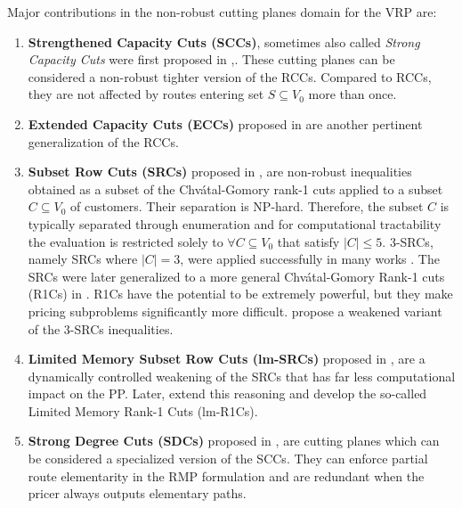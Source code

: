 Major contributions in the non-robust cutting planes domain for the VRP are:
\begin{enumerate}
	\setlength{\itemsep}{0pt}
	\setlength{\parskip}{0pt}

	\item \textbf{Strengthened Capacity Cuts (SCCs)}, sometimes also called \textit{Strong Capacity Cuts}
	      were first proposed in \textcite{baldacci2008},.
	      These cutting planes can be considered a non-robust tighter version of the RCCs.
	      Compared to RCCs, they are not affected by routes entering set $S \subseteq V_0$ more than once.
	\item \textbf{Extended Capacity Cuts (ECCs)} proposed in \textcite{pessoa2008, pessoa2009}
	      are another pertinent generalization of the RCCs.
	\item \textbf{Subset Row Cuts (SRCs)} proposed in \textcite{jepsen2008subsetrow},
	      are non-robust inequalities obtained as a subset of the
	      Chv\'atal-Gomory rank-1 cuts \parencite{chvatal1973}
	      applied to a subset $C \subseteq V_0$ of customers.
	      Their separation is NP-hard.
	      Therefore, the subset $C$ is typically separated through enumeration
	      and for computational tractability the evaluation is restricted solely to $\forall C \subseteq V_0$
	      that satisfy $|C| \le 5$.
	      3-SRCs, namely SRCs where $|C| = 3$, were applied successfully in many works \parencite{desaulniers2008, jepsen2011, baldacci2011, contardo2014, pecin2017improved}.
	      The SRCs were later generalized to a more general Chv\'atal-Gomory Rank-1 cuts (R1Cs) in \textcite{petersen2008}.
	      R1Cs have the potential to be extremely powerful, but they make pricing subproblems significantly more difficult.
	      \textcite{baldacci2011} propose a weakened variant of the 3-SRCs inequalities.
	\item \textbf{Limited Memory Subset Row Cuts (lm-SRCs)} proposed in \textcite{pecin2017improved},
	      are a dynamically controlled weakening of the SRCs that has far less computational impact on the PP.
	      Later, \textcite{pecin2017limited} extend this reasoning
	      and develop the so-called Limited Memory Rank-1 Cuts (lm-R1Cs).
	\item \textbf{Strong Degree Cuts (SDCs)} proposed in \textcite{contardo2011, contardo2014},
	      are cutting planes which can be considered
	      a specialized version of the SCCs.
	      They can enforce partial route elementarity in the RMP formulation
	      and are redundant when the pricer always outputs elementary paths.

\end{enumerate}
